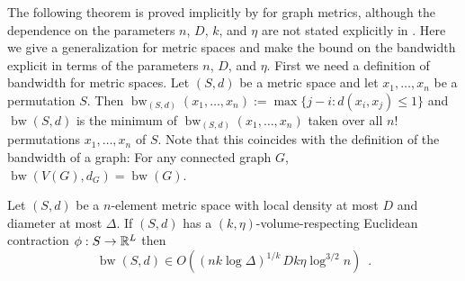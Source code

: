 \documentclass{patmorin}
\DeclareMathOperator{\bw}{bw}
\begin{document}
The following theorem is proved implicitly by \citet{feige:approximating} for graph metrics, although the dependence on the parameters $n$, $D$, $k$, and $\eta$ are not stated explicitly in \cite{feige:approximating}. Here we give a generalization for metric spaces and make the bound on the bandwidth explicit in terms of the parameters $n$, $D$, and $\eta$.  First we need a definition of bandwidth for metric spaces.  Let $(S,d)$ be a metric space and let $x_1,\ldots,x_n$ be a permutation $S$.  Then $\bw_{(S,d)}(x_1,\ldots,x_n):=\max\{j-i:d(x_i,x_j)\le 1\}$ and $\bw(S,d)$ is the minimum of $\bw_{(S,d)}(x_1,\ldots,x_n)$ taken over all $n!$ permutations $x_1,\ldots,x_n$ of $S$.  Note that this coincides with the definition of the bandwidth of a graph: For any connected graph $G$, $\bw(V(G),d_G)=\bw(G)$.




\begin{thm}\label{volume_density_bandwidth}
  Let $(S,d)$ be a $n$-element metric space with local density at most $D$ and diameter at most $\Delta$.  If $(S,d)$ has a $(k,\eta)$-volume-respecting Euclidean contraction $\phi:S\to\mathbb{R}^L$
  then
  \[
    \bw(S,d) \in O((nk\log\Delta)^{1/k}\,Dk\eta\log^{3/2} n) \enspace .
  \]
\end{thm}

\end{document}
